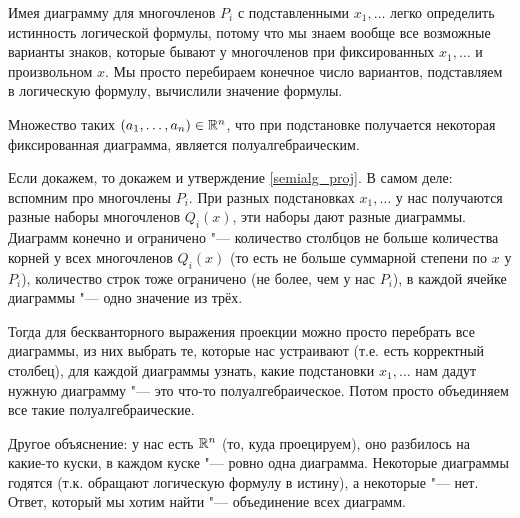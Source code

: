 	\begin{Rem}
		Имея диаграмму для многочленов $P_i$ с подставленными $x_1, \dots$ легко определить истинность логической формулы, потому что мы знаем вообще все возможные варианты знаков,
		которые бывают у многочленов при фиксированных $x_1, \dots$ и произвольном $x$.
		Мы просто перебираем конечное число вариантов, подставляем в логическую формулу, вычислили значение формулы.
	\end{Rem}

	\begin{assertion}\label{fix_diag_semialg}
		Множество таких $(a_1, \dots, a_n) \in \mathbb{R}^n$, что при подстановке получается некоторая фиксированная диаграмма, является полуалгебраическим.
	\end{assertion}
	Если докажем, то докажем и утверждение \ref{semialg_proj}.
	В самом деле: вспомним про многочлены $P_i$.
	При разных подстановках $x_1, \dots$ у нас получаются разные наборы многочленов $Q_i(x)$, эти наборы дают разные диаграммы.
	Диаграмм конечно и ограничено "--- количество столбцов не больше количества корней у всех многочленов $Q_i(x)$ (то есть не больше суммарной степени по $x$ у $P_i$),
	количество строк тоже ограничено (не более, чем у нас $P_i$), в каждой ячейке диаграммы "--- одно значение из трёх.

	Тогда для бескванторного выражения проекции можно просто перебрать все диаграммы, из них выбрать те, которые нас устраивают (т.е. есть корректный столбец),
	для каждой диаграммы узнать, какие подстановки $x_1, \dots$ нам дадут нужную диаграмму "--- это что-то полуалгебраическое.
	Потом просто объединяем все такие полуалгебраические.

	Другое объяснение: у нас есть $\mathbb{R}^n$ (то, куда проецируем), оно разбилось на какие-то куски, в каждом куске "--- ровно одна диаграмма.
	Некоторые диаграммы годятся (т.к. обращают логическую формулу в истину), а некоторые "--- нет.
	Ответ, который мы хотим найти "--- объединение всех диаграмм.
	\begin{exmp}
		\TODO
	\end{exmp}

